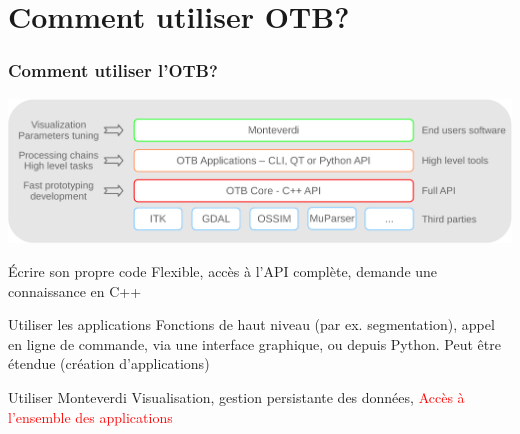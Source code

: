 \documentclass[8pt]{beamer}
\begin{document}
\section{Comment utiliser OTB?}

\begin{frame}
\frametitle{Comment utiliser l'OTB?}
\vspace{-0.5cm}
\begin{center}
\includegraphics[width=\textwidth]{images/sandwich.pdf}
\end{center}
\vspace{-0.5cm}
\begin{block}{Écrire son propre code}
 Flexible, accès à l'API complète, demande une connaissance en C++
\end{block}
\begin{block}{Utiliser les applications}
 Fonctions de haut niveau (par ex. segmentation), appel en ligne de commande, via une interface graphique, ou depuis Python. Peut être étendue (création d'applications)
\end{block}
\begin{block}{Utiliser Monteverdi}
Visualisation, gestion persistante des données, \textcolor{red}{Accès à l'ensemble des applications}
\end{block}
\end{frame}
\end{document}
